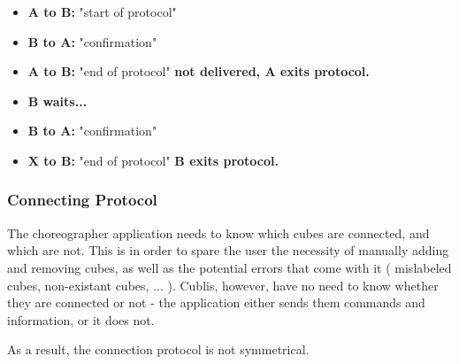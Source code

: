 \begin{itemize}
\item[] \textbf{A to B:} "start of protocol"
\item[] \textbf{B to A:} "confirmation"
\item[] \textbf{A to B:} "end of protocol" \textbf{not delivered, A exits protocol.}
\item[] \textbf{B waits...}
\item[] \textbf{B to A:} "confirmation"
\item[] \textbf{X to B:} "end of protocol"  \textbf{B exits protocol.}
\end{itemize}


\subsubsection{Connecting Protocol}

The choreographer application needs to know which cubes are connected, and which are not. This is in order to spare the user the necessity of manually adding and removing cubes, as well as the potential errors that come with it ( mislabeled cubes, non-existant cubes, ... ). Cublis, however, have no need to know whether they are connected or not - the application either sends them commands and information, or it does not.

As a result, the connection protocol is not symmetrical. 

